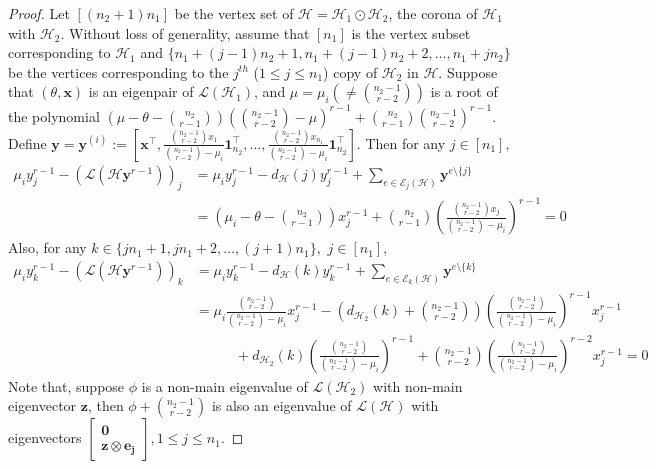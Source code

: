 \documentclass[10pt,a4paper]{article}
\begin{document}
	\begin{proof}
		Let $[(n_2+1)n_1]$ be the vertex set of $\mathcal{H} = \mathcal{H}_1 \odot \mathcal{H}_2$, the corona of $\mathcal{H}_1$ with $\mathcal{H}_2$.
		Without loss of generality, assume that $[n_1]$ is the vertex subset corresponding to $\mathcal{H}_1$ and $\{  n_1 + (j-1)n_2+ 1, n_1 + (j-1)n_2+ 2,\ldots, n_1+jn_2\}$ be the vertices corresponding to the $j^{th}$ ($1 \leq j \leq n_1$) copy of $\mathcal{H}_2$ in $\mathcal{H}$.
		Suppose that $(\theta, \mathbf{x})$ is an eigenpair of $\mathcal{L}(\mathcal{H}_1)$, and $\mu = \mu_i (\neq \binom{n_2-1}{r-2})$ is a root of the polynomial 
		$\left( \mu-\theta-\binom{n_2}{r-1}\right)\left(\binom{n_2-1}{r-2}-\mu \right)^{r-1} + \binom{n_2}{r-1}\binom{n_2-1}{r-2}^{r-1}.$
		Define $\mathbf{y} = \mathbf{y}^{(i)} := \left[ \mathbf{x}^\intercal, \frac{\binom{n_2-1}{r-2} x_1}{\binom{n_2-1}{r-2}-\mu_i}\mathbf{1}_{n_2}^\intercal, \ldots , \frac{\binom{n_2-1}{r-2}x_{n_1}}{\binom{n_2-1}{r-2} - \mu_i}\mathbf{1}_{n_2}^\intercal \right].$
		Then for any $j \in [n_1],$
		\begin{align*}
			\mu_i y_j^{r-1} - \left( \mathcal{L}(\mathcal{H} \mathbf{y}^{r-1}) \right)_j   &=  \mu_i y_j^{r-1}-d_{\mathcal{H}}(j) y_j^{r-1} + \sum\limits_{e \in \mathcal{E}_j(\mathcal{H})} \mathbf{y}^{ e \setminus \{j \} }\\
			&= \left(\mu_i-\theta-\binom{n_2}{r-1}\right)x_j^{r-1} + \binom{n_2}{r-1} \left( \frac{\binom{n_2-1}{r-2} x_j}{\binom{n_2-1}{r-2}-\mu_i}\right)^{r-1}=0
		\end{align*}
		Also, for any $k \in \{ j n_1+ 1, j n_1+2,\ldots, (j+1)n_1\},$ $j \in [n_1]$,
		\begin{align*}
			\mu_i y_k^{r-1} - \left( \mathcal{L}(\mathcal{H} \mathbf{y}^{r-1}) \right)_k   &=  \mu_i y_k^{r-1} - d_{\mathcal{H}}(k) y_k^{r-1} + \sum\limits_{e \in \mathcal{E}_k(\mathcal{H})} \mathbf{y}^{ e \setminus \{ k\} } \\
			&= \mu_i \frac{\binom{n_2-1}{r-2}}{\binom{n_2-1}{r-2}-\mu_i} x_j^{r-1} - \left(d_{\mathcal{H}_2}(k) + \binom{n_2-1}{r-2}\right) \left(\frac{\binom{n_2-1}{r-2}}{\binom{n_2-1}{r-2}-\mu_i}\right)^{r-1} x_j^{r-1}  \\
			&~~~~~~~~~~~~~+ d_{\mathcal{H}_2}(k)\left( \frac{\binom{n_2-1}{r-2}}{\binom{n_2-1}{r-2}-\mu_i}  \right)^{r-1} + \binom{n_2-1}{r-2} \left(\frac{\binom{n_2-1}{r-2}}{\binom{n_2-1}{r-2}-\mu_i}\right)^{r-2} x_j^{r-1} =0
		\end{align*}
		\noindent Note that, suppose $\phi$ is a non-main eigenvalue of $\mathcal{L}(\mathcal{H}_2)$ with non-main eigenvector $\mathbf{z}$, then $\phi+\binom{n_2-1}{r-2}$ is also an eigenvalue of $\mathcal{L}(\mathcal{H})$ with eigenvectors
		$\left[\begin{matrix}
			\mathbf{0} \\ \mathbf{z} \otimes \mathbf{e_j} 
		\end{matrix}\right], 1 \leq j \leq n_1.$
	\end{proof}
	
\end{document}
